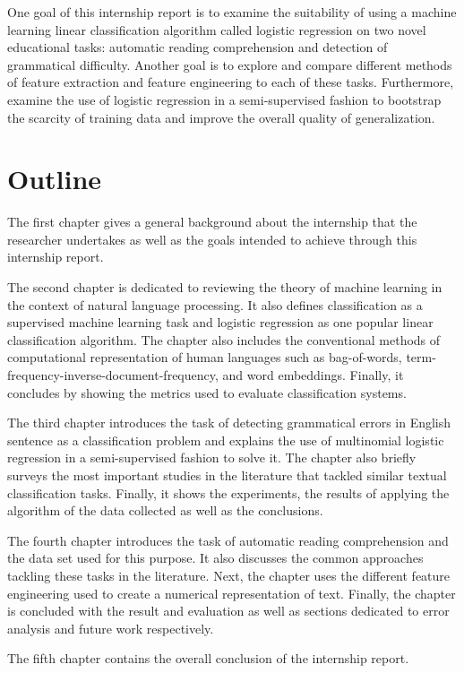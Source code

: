 One goal of this internship report is to examine the suitability of using a machine learning linear classification algorithm called logistic regression on two novel educational tasks: automatic reading comprehension and detection of grammatical difficulty. Another goal is to explore and compare different methods of feature extraction and feature engineering to each of these tasks. Furthermore, examine the use of logistic regression in a semi-supervised fashion to bootstrap the scarcity of training data and improve the overall quality of generalization. 


\section{Outline}
The first chapter gives a general background about the internship that the researcher undertakes as well as the goals intended to achieve through this internship report. 

The second chapter is dedicated to reviewing the theory of machine learning in the context of natural language processing. It also defines classification as a supervised machine learning task and logistic regression as one popular linear classification algorithm. The chapter also includes the conventional methods of computational representation of human languages such as bag-of-words, term-frequency-inverse-document-frequency, and word embeddings. Finally, it concludes by showing the metrics used to evaluate classification systems. 

The third chapter introduces the task of detecting grammatical errors in English sentence as a classification problem and explains the use of multinomial logistic regression in a semi-supervised fashion to solve it. The chapter also briefly surveys the most important studies in the literature that tackled similar textual
classification tasks. Finally, it shows the experiments, the results of
applying the algorithm of the data collected as well as the conclusions. 

The fourth chapter introduces the task of automatic reading comprehension and the data set used for this purpose. It also discusses the common approaches tackling these tasks in the literature. Next, the chapter uses the different feature engineering used to create a numerical representation of text. Finally, the chapter is concluded with the result and evaluation as well as sections dedicated to error analysis and future work respectively. 

The fifth chapter contains the overall conclusion of the internship report.  
